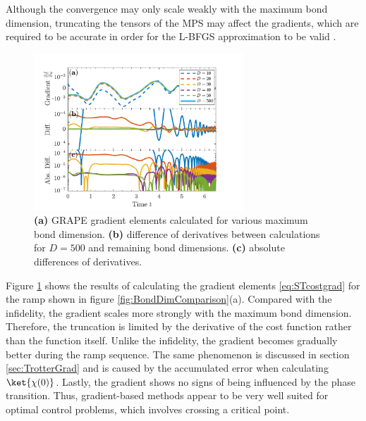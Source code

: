 Although the convergence may only scale weakly with the maximum bond dimension, truncating the tensors of the MPS may affect the gradients, which are required to be accurate in order for the L-BFGS approximation to be valid \cite{deFouquieres2011}. 
\begin{figure}[h!]
    \centering
    \includegraphics[width=0.7\textwidth]{Figures/BondDim/GradientBondComparison.pdf}
    \caption{\textbf{(a)} GRAPE gradient elements calculated for various maximum bond dimension. \textbf{(b)} difference of derivatives between calculations for $D = 500$ and remaining bond dimensions. \textbf{(c)} absolute differences of derivatives.}
    \label{fig:GradientBondDim}
\end{figure}
Figure \ref{fig:GradientBondDim} shows the results of calculating the gradient elements \ref{eq:STcostgrad} for the ramp shown in figure \ref{fig:BondDimComparison}(a). Compared with the infidelity, the gradient scales more strongly with the maximum bond dimension. Therefore, the truncation is limited by the derivative of the cost function rather than the function itself. Unlike the infidelity, the gradient becomes gradually better during the ramp sequence. The same phenomenon is discussed in section \ref{sec:TrotterGrad} and is caused by the accumulated error when calculating $\ket{\chi (0)}$. Lastly, the gradient shows no signs of being influenced by the phase transition. Thus, gradient-based methods appear to be very well suited for optimal control problems, which involves crossing a critical point.



